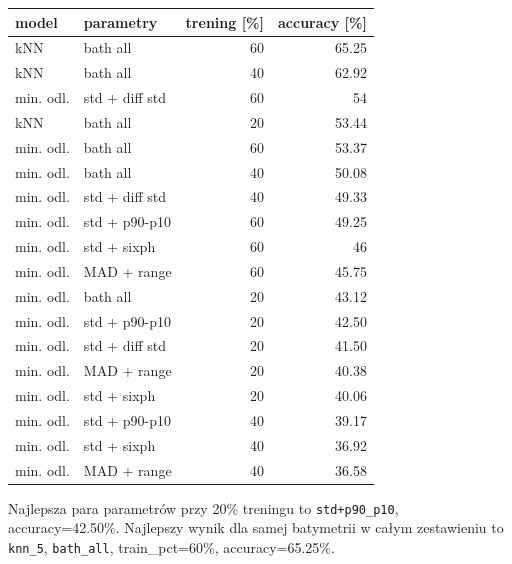 \documentclass[11pt,a4paper]{article}
\begin{document}
\begin{table}[H]
\centering
\small
\begin{tabular}{llrr}
\toprule
model & parametry & trening [\%] & accuracy [\%] \\
\midrule
kNN & bath all & 60 & 65.25 \\
kNN & bath all & 40 & 62.92 \\
min. odl. & std + diff std & 60 & 54 \\
kNN & bath all & 20 & 53.44 \\
min. odl. & bath all & 60 & 53.37 \\
min. odl. & bath all & 40 & 50.08 \\
min. odl. & std + diff std & 40 & 49.33 \\
min. odl. & std + p90-p10 & 60 & 49.25 \\
min. odl. & std + sixph & 60 & 46 \\
min. odl. & MAD + range & 60 & 45.75 \\
min. odl. & bath all & 20 & 43.12 \\
min. odl. & std + p90-p10 & 20 & 42.50 \\
min. odl. & std + diff std & 20 & 41.50 \\
min. odl. & MAD + range & 20 & 40.38 \\
min. odl. & std + sixph & 20 & 40.06 \\
min. odl. & std + p90-p10 & 40 & 39.17 \\
min. odl. & std + sixph & 40 & 36.92 \\
min. odl. & MAD + range & 40 & 36.58 \\
\bottomrule
\end{tabular}
\end{table}

Najlepsza para parametrów przy 20\% treningu to \texttt{std+p90\_p10}, accuracy=42.50\%. Najlepszy wynik dla samej batymetrii w całym zestawieniu to \texttt{knn\_5}, \texttt{bath\_all}, train\_pct=60\%, accuracy=65.25\%.
\end{document}
